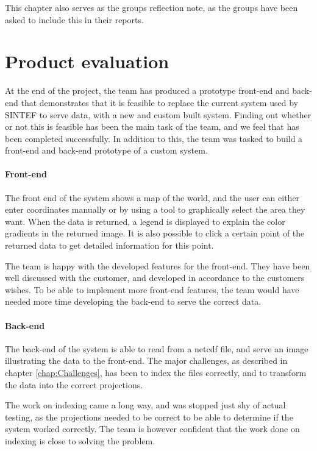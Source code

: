 \documentclass[11pt,a4paper,titlepage,oneside]{report}
\begin{document}
This chapter also serves as the groups reflection note, as the groups have been asked to include this in their reports. 

\section{Product evaluation}
At the end of the project, the team has produced a \gls{prototype} \gls{front-end} and \gls{back-end} that demonstrates that it is feasible to replace the current system used by SINTEF to serve data, with a new and custom built system. Finding out whether or not this is feasible has been the main task of the team, and we feel that has been completed successfully. In addition to this, the team was tasked to build a front-end and back-end prototype of a custom system.

\paragraph{Front-end}
The front end of the system shows a map of the world, and the user can either enter coordinates manually or by using a tool to graphically select the area they want. When the data is returned, a legend is displayed to explain the color gradients in the returned image. It is also possible to click a certain point of the returned data to get detailed information for this point.

The team is happy with the developed features for the \gls{front-end}. They have been well discussed with the customer, and developed in accordance to the customers wishes. To be able to implement more \gls{front-end} features, the team would have needed more time developing the \gls{back-end} to serve the correct data. 

\paragraph{Back-end}
The \gls{back-end} of the system is able to read from a \gls{netcdf} file, and serve an image illustrating the data to the \gls{front-end}. The major challenges, as described in chapter \ref{chap:Challenges}, has been to index the files correctly, and to transform the data into the correct projections. 

The work on indexing came a long way, and was stopped just shy of actual testing, as the projections needed to be correct to be able to determine if the system worked correctly. The team is however confident that the work done on indexing is close to solving the problem.
\end{document}
